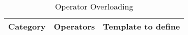 \begin{table}
\begin{tabular}[htb]{|c|c|c|}
\hline
Category & Operators & Template to define\\ 
\hline \hline

%
%
%
%

%

\end{tabular}
\caption{Operator Overloading}
\label{table:operatoroverloading}
\end{table}

